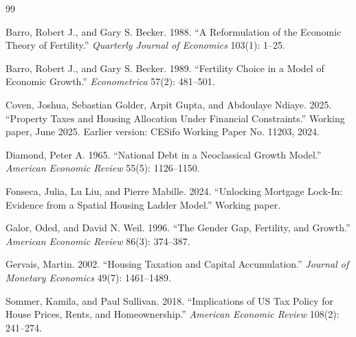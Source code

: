 \documentclass[11pt]{article}
\newcommand{\1}{\mathbf 1}
\begin{document}
\begin{thebibliography}{99}
\small

Barro, Robert J., and Gary S. Becker. 1988. ``A Reformulation of the Economic Theory of Fertility.'' \emph{Quarterly Journal of Economics} 103(1): 1--25.

Barro, Robert J., and Gary S. Becker. 1989. ``Fertility Choice in a Model of Economic Growth.'' \emph{Econometrica} 57(2): 481--501.

Coven, Joshua, Sebastian Golder, Arpit Gupta, and Abdoulaye Ndiaye. 2025. ``Property Taxes and Housing Allocation Under Financial Constraints.'' Working paper, June 2025. Earlier version: CESifo Working Paper No. 11203, 2024.

Diamond, Peter A. 1965. ``National Debt in a Neoclassical Growth Model.'' \emph{American Economic Review} 55(5): 1126--1150.

Fonseca, Julia, Lu Liu, and Pierre Mabille. 2024. ``Unlocking Mortgage Lock-In: Evidence from a Spatial Housing Ladder Model.'' Working paper.

Galor, Oded, and David N. Weil. 1996. ``The Gender Gap, Fertility, and Growth.'' \emph{American Economic Review} 86(3): 374--387.

Gervais, Martin. 2002. ``Housing Taxation and Capital Accumulation.'' \emph{Journal of Monetary Economics} 49(7): 1461--1489.

Sommer, Kamila, and Paul Sullivan. 2018. ``Implications of US Tax Policy for House Prices, Rents, and Homeownership.'' \emph{American Economic Review} 108(2): 241--274.

\end{thebibliography}
\end{document}
